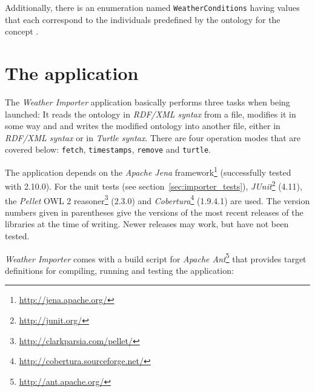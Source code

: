 Additionally, there is an enumeration named \texttt{WeatherConditions} having values that each correspond to the individuals predefined by the ontology for the concept .

\section{The application}
\label{sec:importer_application}

The \emph{Weather Importer} application basically performs three tasks when being launched: It reads the \thinkhomeweather ontology in \emph{RDF/XML syntax}\cite{RDF_XML} from a file, modifies it in some way and and writes the modified ontology into another file, either in \emph{RDF/XML syntax} or in \emph{Turtle syntax}\cite{Turtle}. There are four operation modes that are covered below: \texttt{fetch}, \texttt{timestamps}, \texttt{remove} and \texttt{turtle}.

The application depends on the \emph{Apache Jena} framework\footnote{\href{http://jena.apache.org/}{http://jena.apache.org/}} (successfully tested with 2.10.0). For the unit tests (see section~\ref{sec:importer_tests}), \emph{JUnit}\footnote{\href{http://junit.org/}{http://junit.org/}} (4.11), the \emph{Pellet} OWL 2 reasoner\footnote{\href{http://clarkparsia.com/pellet/}{http://clarkparsia.com/pellet/}} (2.3.0) and \emph{Cobertura}\footnote{\href{http://cobertura.sourceforge.net/}{http://cobertura.sourceforge.net/}} (1.9.4.1) are used. The version numbers given in parentheses give the versions of the most recent releases of the libraries at the time of writing. Newer releases may work, but have not been tested.

\emph{Weather Importer} comes with a build script for \emph{Apache Ant}\footnote{\href{http://ant.apache.org/}{http://ant.apache.org/}} that provides target definitions for compiling, running and testing the application:

